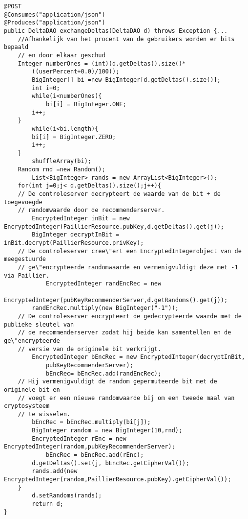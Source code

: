 \begin{verbatim}
@POST
@Consumes("application/json")
@Produces("application/json")
public DeltaDAO exchangeDeltas(DeltaDAO d) throws Exception {...
    //Afhankelijk van het procent van de gebruikers worden er bits bepaald 
    // en door elkaar geschud
	Integer numberOnes = (int)(d.getDeltas().size()*
		((userPercent+0.0)/100));
    	BigInteger[] bi =new BigInteger[d.getDeltas().size()];
    	int i=0;
    	while(i<numberOnes){
    		bi[i] = BigInteger.ONE;
        i++;
   	}
    	while(i<bi.length){
        bi[i] = BigInteger.ZERO;
        i++;
    }
    	shuffleArray(bi);
   	Random rnd =new Random();
    	List<BigInteger> rands = new ArrayList<BigInteger>();
    for(int j=0;j< d.getDeltas().size();j++){
    // De controleserver decrypteert de waarde van de bit + de toegevoegde 
    // randomwaarde door de recommenderserver.
       	EncryptedInteger inBit = new EncryptedInteger(PaillierResource.pubKey,d.getDeltas().get(j));
       	BigInteger decryptInBit =  inBit.decrypt(PaillierResource.privKey);
    // De controleserver cree\"ert een EncryptedIntegerobject van de meegestuurde 
    // ge\"encrypteerde randomwaarde en vermenigvuldigt deze met -1 via Paillier.
    		EncryptedInteger randEncRec = new 
        		EncryptedInteger(pubKeyRecommenderServer,d.getRandoms().get(j));
      	randEncRec.multiply(new BigInteger("-1"));
    // De controleserver encrypteert de gedecrypteerde waarde met de publieke sleutel van 
    // de recommenderserver zodat hij beide kan samentellen en de ge\"encrypteerde 
    // versie van de originele bit verkrijgt.
      	EncryptedInteger bEncRec = new EncryptedInteger(decryptInBit,
      		pubKeyRecommenderServer);
        	bEncRec= bEncRec.add(randEncRec);
    // Hij vermenigvuldigt de random gepermuteerde bit met de originele bit en 
    // voegt er een nieuwe randomwaarde bij om een tweede maal van cryptosysteem 
    // te wisselen.
       	bEncRec = bEncRec.multiply(bi[j]);
        BigInteger random = new BigInteger(10,rnd);
       	EncryptedInteger rEnc = new EncryptedInteger(random,pubKeyRecommenderServer);
        	bEncRec = bEncRec.add(rEnc);
       	d.getDeltas().set(j, bEncRec.getCipherVal());
       	rands.add(new EncryptedInteger(random,PaillierResource.pubKey).getCipherVal());        
   	}
    	d.setRandoms(rands);
    	return d;        
}
\end{verbatim}